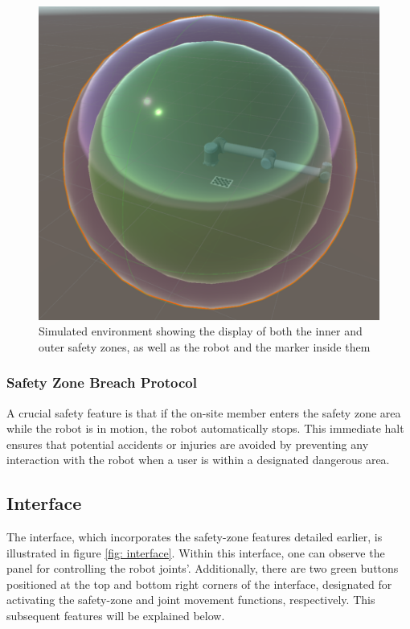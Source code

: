         \begin{figure}[h]
            \centering
            \includegraphics[width=0.5\linewidth]{figs/dual-safetyzone-robot.png}
            \caption{Simulated environment showing the display of both the inner and outer safety zones, as well as the robot and the marker inside them}
            \label{fig:dual-safety}
        \end{figure}

        \subsubsection{Safety Zone Breach Protocol}

            A crucial safety feature is that if the on-site member enters the safety zone area while the robot is in motion, the robot 
            automatically stops. This immediate halt ensures that potential accidents or injuries are avoided by preventing any interaction 
            with the robot when a user is within a designated dangerous area.
                
    \subsection{Interface}

        The interface, which incorporates the safety-zone features detailed earlier, is illustrated in figure \ref{fig: interface}. 
        Within this interface, one can observe the panel for controlling the robot joints'. Additionally, there are two green buttons 
        positioned at the top and bottom right corners of the interface, designated for activating the safety-zone and joint movement functions, 
        respectively. This subsequent features will be explained below.

